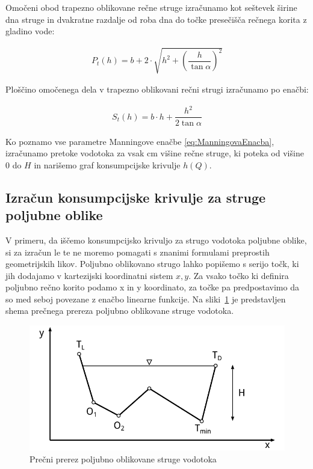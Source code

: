 \begin{enumerate}
	Omočeni obod trapezno oblikovane rečne struge izračunamo kot seštevek širine dna struge in dvakratne razdalje od roba dna do točke presečišča rečnega korita z gladino vode:
	
	\begin{ceqn}
	\begin{align}
	P_{t}(h) = b + 2 \cdot \sqrt{h^2 + \left(\dfrac{h} {\tan\alpha} \right)^{2}}
	\end{align}
	\end{ceqn}
	
	Ploščino omočenega dela v trapezno oblikovani rečni strugi izračunamo po enačbi:
	\begin{ceqn}
	\begin{align}
	S_{t}(h) = b \cdot h + \dfrac{h^2}{ 2\tan\alpha}
	\end{align}
	\end{ceqn}
	
\end{enumerate}



Ko poznamo vse parametre Manningove enačbe \ref{eq:ManningovaEnacba}, izračunamo pretoke vodotoka za vsak cm višine rečne struge, ki poteka od višine 0 do $H$ in narišemo graf konsumpcijske krivulje $h(Q)$.


\newpage
\subsection{Izračun konsumpcijske krivulje za struge poljubne oblike}\label{sec:pretokNumericnaMetoda}


V primeru, da iščemo konsumpcijsko krivuljo za strugo vodotoka poljubne oblike, si za izračun le te ne moremo pomagati s znanimi formulami preprostih geometrijskih likov. Poljubno oblikovano strugo lahko popišemo s serijo točk, ki jih dodajamo v kartezijski koordinatni sistem $x,y$. Za vsako točko ki definira poljubno rečno korito podamo x in y koordinato, za točke pa predpostavimo da so med seboj povezane z enačbo linearne funkcije. Na sliki~\ref{fig:poljubnaStruga} je predstavljen shema prečnega prereza poljubno oblikovane struge vodotoka.

\begin{figure}[ht!]
	\begin{centering}
		\includegraphics{slike/customChannel/customStruga.pdf}		
		\caption{Prečni prerez poljubno oblikovane struge vodotoka}\label{fig:poljubnaStruga}
	\end{centering}
\end{figure}



